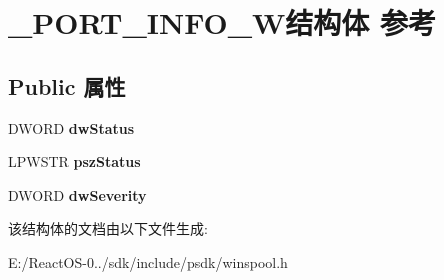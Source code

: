 \hypertarget{struct___p_o_r_t___i_n_f_o__3_w}{}\section{\+\_\+\+P\+O\+R\+T\+\_\+\+I\+N\+F\+O\+\_\+W结构体 参考}
\label{struct___p_o_r_t___i_n_f_o__3_w}
\subsection*{Public 属性}
\begin{DoxyCompactItemize}
\item 
\mbox{\label{struct___p_o_r_t___i_n_f_o__3_w_a0c6391b7663543ce791b9109b9e8fd5c}} 
D\+W\+O\+RD {\bfseries dw\+Status}
\item 
\mbox{\label{struct___p_o_r_t___i_n_f_o__3_w_adf7bdc931f1629f91ffa724859aef6fa}} 
L\+P\+W\+S\+TR {\bfseries psz\+Status}
\item 
\mbox{\label{struct___p_o_r_t___i_n_f_o__3_w_af114c9420025c4321b2deba8c6a01f61}} 
D\+W\+O\+RD {\bfseries dw\+Severity}
\end{DoxyCompactItemize}


该结构体的文档由以下文件生成\+:\begin{DoxyCompactItemize}
\item 
E\+:/\+React\+O\+S-\/0../sdk/include/psdk/winspool.\+h\end{DoxyCompactItemize}
